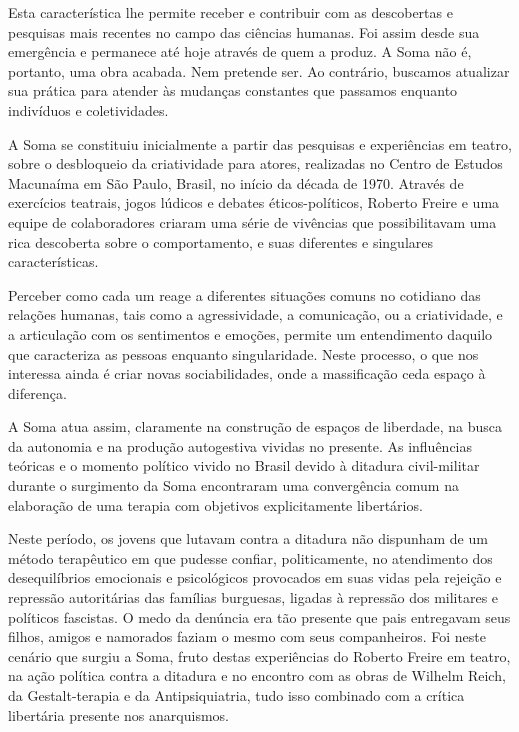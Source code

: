 Esta característica lhe permite receber e contribuir com as descobertas
e pesquisas mais recentes no campo das ciências humanas. Foi assim desde
sua emergência e permanece até hoje através de quem a produz. A Soma não
é, portanto, uma obra acabada. Nem pretende ser. Ao contrário, buscamos
atualizar sua prática para atender às mudanças constantes que passamos
enquanto indivíduos e coletividades.

A Soma se constituiu inicialmente a partir das pesquisas e experiências
em teatro, sobre o desbloqueio da criatividade para atores, realizadas
no Centro de Estudos Macunaíma em São Paulo, Brasil, no início da década
de 1970. Através de exercícios teatrais, jogos lúdicos e debates
éticos-políticos, Roberto Freire e uma equipe de colaboradores criaram
uma série de vivências que possibilitavam uma rica descoberta sobre o
comportamento, e suas diferentes e singulares características.

Perceber como cada um reage a diferentes situações comuns no cotidiano
das relações humanas, tais como a agressividade, a comunicação, ou a
criatividade, e a articulação com os sentimentos e emoções, permite um
entendimento daquilo que caracteriza as pessoas enquanto singularidade.
Neste processo, o que nos interessa ainda é criar novas sociabilidades,
onde a massificação ceda espaço à diferença.

A Soma atua assim, claramente na construção de espaços de liberdade, na
busca da autonomia e na produção autogestiva vividas no presente. As
influências teóricas e o momento político vivido no Brasil devido à
ditadura civil-militar durante o surgimento da Soma encontraram uma
convergência comum na elaboração de uma terapia com objetivos
explicitamente libertários.

Neste período, os jovens que lutavam contra a ditadura não dispunham de
um método terapêutico em que pudesse confiar, politicamente, no
atendimento dos desequilíbrios emocionais e psicológicos provocados em
suas vidas pela rejeição e repressão autoritárias das famílias
burguesas, ligadas à repressão dos militares e políticos fascistas. O
medo da denúncia era tão presente que pais entregavam seus filhos,
amigos e namorados faziam o mesmo com seus companheiros. Foi neste
cenário que surgiu a Soma, fruto destas experiências do Roberto Freire
em teatro, na ação política contra a ditadura e no encontro com as obras
de Wilhelm Reich, da Gestalt-terapia e da Antipsiquiatria, tudo isso
combinado com a crítica libertária presente nos anarquismos.

